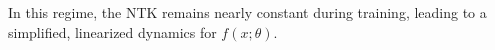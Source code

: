 In this regime, the NTK remains nearly constant during training, leading to a simplified, linearized dynamics for \(f(x; \theta)\).
%
%








